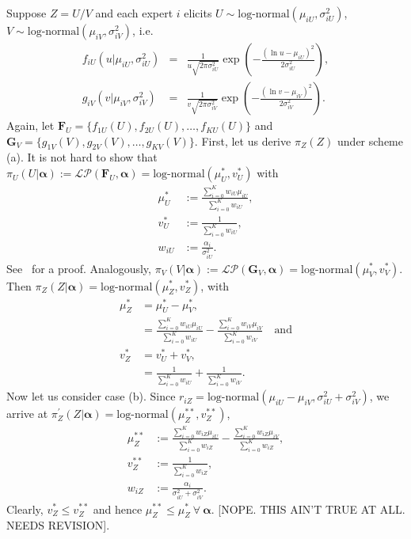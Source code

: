 \documentclass[a4paper, notitlepage, 10pt]{article}
\begin{document}
Suppose $Z = U/V$ and each expert $i$ elicits $U \sim \text{log-normal}(\mu_{iU}, \sigma_{iU}^2)$, $V \sim \text{log-normal}(\mu_{iV}, \sigma_{iV}^2)$, i.e.
\begin{eqnarray*}
\nonumber
f_{iU}(u | \mu_{iU}, \sigma_{iU}^2) &=& \frac{1}{u \sqrt{2\pi\sigma_{iU}^2}} \exp\left( - \frac{ \left( \ln u - \mu_{iU} \right)^2 }{2 \sigma_{iU}^2} \right), \\
g_{iV}(v | \mu_{iV}, \sigma_{iV}^2) &=& \frac{1}{v \sqrt{2\pi\sigma_{iV}^2}} \exp\left( - \frac{ \left( \ln v - \mu_{iV} \right)^2 }{2 \sigma_{iV}^2} \right).
\end{eqnarray*}
Again, let $\mathbf{F}_U = \{f_{1U}(U), f_{2U}(U), \ldots, f_{KU}(U) \}$ and $\mathbf{G}_V = \{g_{1V}(V), g_{2V}(V), \ldots, g_{KV}(V) \}$.
First, let us derive $\pi_Z(Z)$ under scheme (a).
It is not hard to show that  $\pi_U(U | \boldsymbol\alpha) := \mathcal{LP}(\mathbf{F}_{U}, \boldsymbol \alpha) =  \text{log-normal}(\mu_U^\ast, v_U^\ast)$ with
\begin{align}
 \mu_U^\ast &:= \frac{\sum_{i=0}^K w_{iU} \mu_{iU}}{\sum_{i=0}^K w_{iU}}, \\
 v_U^\ast &:= \frac{1}{\sum_{i=0}^K w_{iU} }, \\
 w_{iU} &:=  \frac{\alpha_i}{\sigma_{iU}^2}.
\end{align}
See~\cite{Carvalho2019} for a proof.
Analogously, $\pi_V(V | \boldsymbol\alpha) := \mathcal{LP}(\mathbf{G}_{V}, \boldsymbol \alpha) =  \text{log-normal}(\mu_V^\ast, v_V^\ast)$.
Then $\pi_Z(Z |  \boldsymbol \alpha) = \text{log-normal}(\mu_Z^{\ast}, v_Z^{\ast})$, with
\begin{align}
\nonumber
 \mu_Z^{\ast} &= \mu_U^\ast - \mu_V^\ast,\\
 &= \frac{\sum_{i=0}^K w_{iU} \mu_{iU}}{\sum_{i=0}^K w_{iU}} - \frac{\sum_{i=0}^K w_{iV} \mu_{iV}}{\sum_{i=0}^K w_{iV}}\quad \text{and} \\
 \nonumber
v_Z^{\ast} &= v_U^\ast + v_V^\ast, \\
&= \frac{1}{\sum_{i=0}^K w_{iU} } + \frac{1}{\sum_{i=0}^K w_{iV} }.
\end{align}
Now let us consider case (b).
Since $r_{iZ} = \text{log-normal}(\mu_{iU} - \mu_{iV}, \sigma_{iU}^2 +  \sigma_{iV}^2)$, we arrive at  $\pi_Z^{\prime}(Z |  \boldsymbol \alpha) = \text{log-normal}(\mu_Z^{\ast\ast}, v_Z^{\ast\ast})$,
\begin{align}
 \mu_Z^{\ast\ast} &:= \frac{\sum_{i=0}^K w_{iZ} \mu_{iU}}{\sum_{i=0}^K w_{iZ}} - \frac{\sum_{i=0}^K w_{iZ} \mu_{iV}}{\sum_{i=0}^K w_{iZ}}, \\
 v_Z^{\ast\ast} &:= \frac{1}{\sum_{i=0}^K w_{iZ} }, \\
 w_{iZ} &:=  \frac{\alpha_i}{\sigma_{iU}^2 + \sigma_{iV}^2}.
\end{align}
Clearly, $v_Z^{\ast} \leq v_Z^{\ast\ast}$ and hence $\mu_Z^{\ast\ast} \leq \mu_Z^{\ast} \: \forall \: \boldsymbol\alpha$. [NOPE. THIS AIN'T TRUE AT ALL. NEEDS REVISION].
\end{document}
